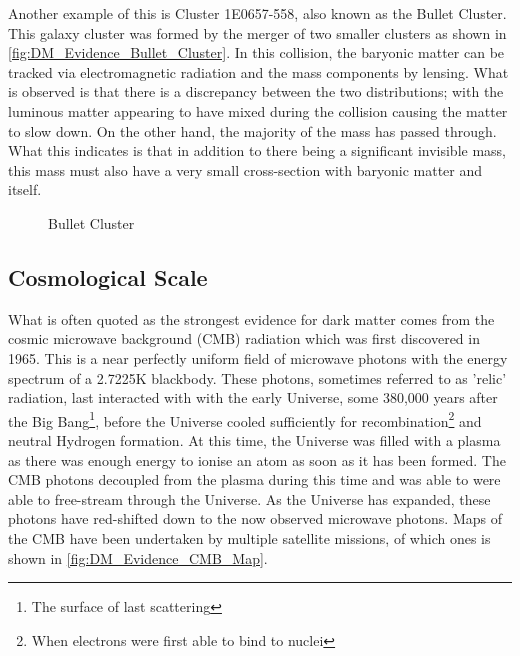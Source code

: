 \par
Another example of this is Cluster 1E0657-558, also known as the Bullet Cluster.
This galaxy cluster was formed by the merger of two smaller clusters as shown in \autoref{fig:DM_Evidence_Bullet_Cluster}.
In this collision, the baryonic matter can be tracked via electromagnetic radiation and the mass components by lensing.
What is observed is that there is a discrepancy between the two distributions; with the luminous matter appearing to have mixed during the collision causing the matter to slow down.
On the other hand, the majority of the mass has passed through.
What this indicates is that in addition to there being a significant invisible mass, this mass must also have a very small cross-section with baryonic matter and itself.
\begin{figure}[!htbp]%
    \centering
    \caption{Bullet Cluster}
    \label{fig:DM_Evidence_Bullet_Cluster}
\end{figure}


\subsection{Cosmological Scale}
\par
What is often quoted as the strongest evidence for dark matter comes from the cosmic microwave background (CMB) radiation which was first discovered in 1965.
This is a near perfectly uniform field of microwave photons with the energy spectrum of a 2.7225K blackbody.
These photons, sometimes referred to as 'relic' radiation, last interacted with with the early Universe, some 380,000 years after the Big Bang\footnote{The surface of last scattering}, before the Universe cooled sufficiently for recombination\footnote{When electrons were first able to bind to nuclei} and neutral Hydrogen formation.
At this time, the Universe was filled with a plasma as there was enough energy to ionise an atom as soon as it has been formed.
The CMB photons decoupled from the plasma during this time and was able to were able to free-stream through the Universe.
As the Universe has expanded, these photons have red-shifted down to the now observed microwave photons.
Maps of the CMB have been undertaken by multiple satellite missions, of which ones is shown in \autoref{fig:DM_Evidence_CMB_Map}.

